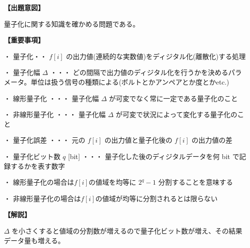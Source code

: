 \noindent \textbf{【出題意図】}

\noindent 量子化に関する知識を確かめる問題である。

\vspace{1em}
\noindent \textbf{【重要事項】}

\medskip
\noindent ・ 量子化・・ $f[i]$ の出力値(連続的な実数値)をディジタル化(離散化)する処理

\medskip
\noindent ・ 量子化幅 $\Delta$ ・・・ どの間隔で出力値のディジタル化を行うかを決めるパラメータ。単位は扱う信号の種類による(ボルトとかアンペアとか度とかetc.)

\medskip
\noindent ・ 線形量子化 ・・・ 量子化幅  $\Delta$ が可変でなく常に一定である量子化のこと

\medskip
\noindent ・ 非線形量子化 ・・・ 量子化幅  $\Delta$ が可変で状況によって変化する量子化のこと

\medskip
\noindent ・ 量子化誤差 ・・・ 元の $f[i]$ の出力値と量子化後の $f[i]$ の出力値の差

\medskip
\noindent ・ 量子化ビット数 $q$ [bit] ・・・ 量子化した後のディジタルデータを何 bit で記録するかを表す数字

\medskip
\noindent ・ 線形量子化の場合は$f[i]$の値域を均等に $2^q-1$ 分割することを意味する

\medskip
\noindent ・ 非線形量子化の場合は$f[i]$の値域が均等に分割されるとは限らない

\vspace{1em}
\noindent \textbf{【解説】}

\noindent $\Delta$ を小さくすると値域の分割数が増えるので量子化ビット数が増え、その結果データ量も増える。
